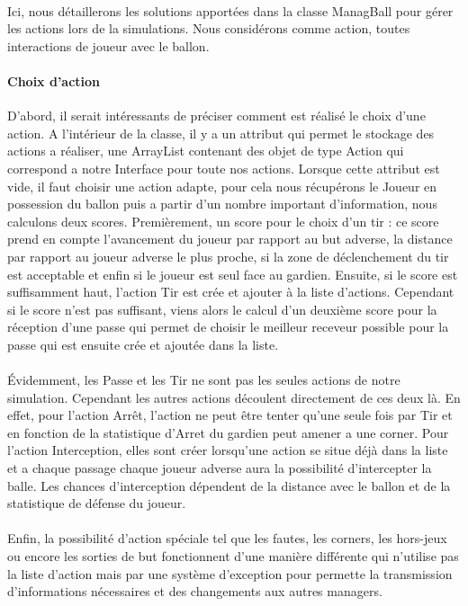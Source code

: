 \paragraph{}
    Ici, nous détaillerons les solutions apportées dans la classe ManagBall pour gérer les actions lors de la simulations. Nous considérons comme action, toutes interactions de joueur avec le ballon.

\paragraph{Choix d'action}
    D'abord, il serait intéressants de préciser comment est réalisé le choix d'une action. A l'intérieur de la classe, il y a un attribut qui permet le stockage des actions a réaliser, une ArrayList contenant des objet de type Action qui correspond a notre Interface pour toute nos actions. Lorsque cette attribut est vide, il faut choisir une action adapte, pour cela nous récupérons le Joueur en possession du ballon puis a partir d'un nombre important d'information, nous calculons deux scores. Premièrement, un score pour le choix d'un tir : ce score prend en compte l'avancement du joueur par rapport au but adverse, la distance par rapport au joueur adverse le plus proche, si la zone de déclenchement du tir est acceptable et enfin si le joueur est seul face au gardien. Ensuite, si le score est suffisamment haut, l'action Tir est crée et ajouter à la liste d'actions. Cependant si le score n'est pas suffisant, viens alors le calcul d'un deuxième score pour la réception d'une passe qui permet de choisir le meilleur receveur possible pour la passe qui est ensuite crée et ajoutée dans la liste.

\paragraph{}
    Évidemment, les Passe et les Tir ne sont pas les seules actions de notre simulation. Cependant les autres actions découlent directement de ces deux là. En effet, pour l'action Arrêt, l'action ne peut être tenter qu'une seule fois par Tir et en fonction de la statistique d'Arret du gardien peut amener a une corner. Pour l'action Interception, elles sont créer lorsqu'une action se situe déjà dans la liste et a chaque passage chaque joueur adverse aura la possibilité d'intercepter la balle. Les chances d'interception dépendent de la distance avec le ballon et de la statistique de défense du joueur.

\paragraph{}
    Enfin, la possibilité d'action spéciale tel que les fautes, les corners, les hors-jeux ou encore les sorties de but fonctionnent d'une manière différente qui n'utilise pas la liste d'action mais par une système d'exception pour permette la transmission d'informations nécessaires et des changements aux autres managers.

